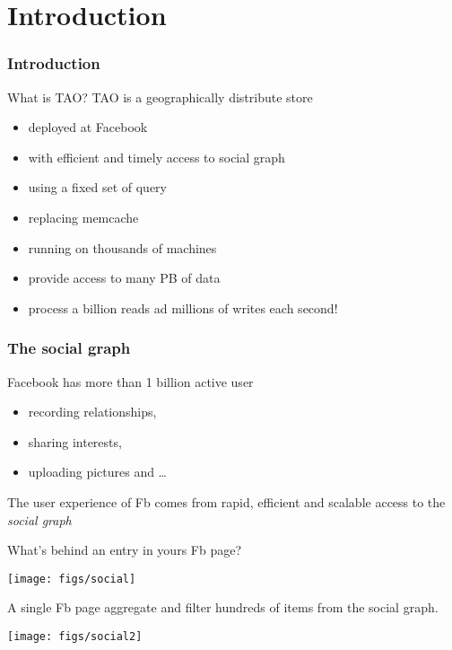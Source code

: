 
\setlength{\parskip}{\baselineskip} 
\section*{Introduction}
\begin{frame}[t]
\frametitle{Introduction}
\begin{block}{What is TAO?}
	TAO is a geographically distribute store
	\begin{itemize}
		\item deployed at Facebook
	 	\item with efficient and timely access to social graph
	 	\item using a fixed set of query
	 	\item replacing memcache
	 	\item running on thousands of machines
	 	\item provide access to many PB of data
	 	\item process a billion reads ad millions of writes each second!
	 \end{itemize} 
\end{block}
\end{frame}

\begin{frame}
\frametitle{The social graph}
Facebook has more than 1 billion active user 
\begin{itemize}
	\item recording relationships,
	\item sharing interests,
	\item uploading pictures and \dots
\end{itemize}

The user experience of Fb comes from rapid, efficient and scalable access to the \emph{social graph}
\end{frame}

\begin{frame}
	What's behind an entry in yours Fb page?

	\begin{center}
	\texttt{[image: figs/social]}	\\
	\end{center}
	A single Fb page aggregate and filter hundreds of items from the social graph.
\end{frame}%

\begin{frame}[t]
\begin{center}
\texttt{[image: figs/social2]}	
\end{center}


\end{frame}

